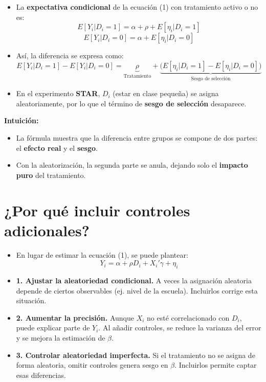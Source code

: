 \documentclass[12pt]{article}
\begin{document}
\begin{itemize}
    \item La \textbf{expectativa condicional} de la ecuación (1) con tratamiento activo o no es:  
    \[
    E[Y_i|D_i=1] = \alpha + \rho + E[\eta_i|D_i=1]
    \]  
    \[
    E[Y_i|D_i=0] = \alpha + E[\eta_i|D_i=0]
    \]
    \item Así, la diferencia se expresa como:  
    \[
    E[Y_i|D_i=1] - E[Y_i|D_i=0] 
    = \underbrace{\rho}_{\text{Tratamiento}} 
    + \underbrace{\big(E[\eta_i|D_i=1] - E[\eta_i|D_i=0]\big)}_{\text{Sesgo de selección}}
    \]
    \item En el experimento \textbf{STAR}, $D_i$ (estar en clase pequeña) se asigna aleatoriamente, por lo que el término de \textbf{sesgo de selección} desaparece.
\end{itemize}

\textbf{Intuición:}
\begin{itemize}
    \item La fórmula muestra que la diferencia entre grupos se compone de dos partes: el \textbf{efecto real} y el \textbf{sesgo}.
    \item Con la aleatorización, la segunda parte se anula, dejando solo el \textbf{impacto puro} del tratamiento.
\end{itemize}

\section*{\noindent\textbf{¿Por qué incluir controles adicionales?}}

\begin{itemize}
    \item En lugar de estimar la ecuación (1), se puede plantear:  
    \[
    Y_i = \alpha + \rho D_i + X_i' \gamma + \eta_i
    \]
    \item \textbf{1. Ajustar la aleatoriedad condicional.}  
    A veces la asignación aleatoria depende de ciertos observables (ej. nivel de la escuela). Incluirlos corrige esta situación.
    \item \textbf{2. Aumentar la precisión.}  
    Aunque $X_i$ no esté correlacionado con $D_i$, puede explicar parte de $Y_i$. Al añadir controles, se reduce la varianza del error y se mejora la estimación de $\beta$.
    \item \textbf{3. Controlar aleatoriedad imperfecta.}  
    Si el tratamiento no se asigna de forma aleatoria, omitir controles genera sesgo en $\beta$. Incluirlos permite captar esas diferencias.
\end{itemize}
\end{document}

